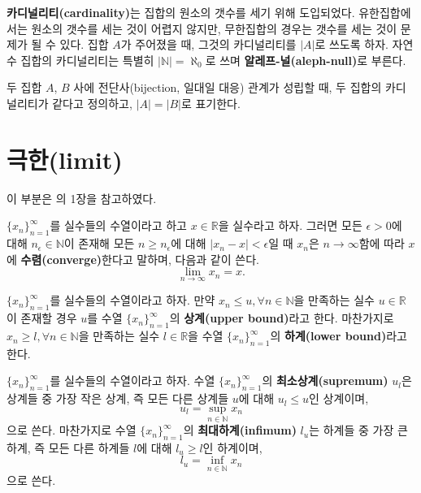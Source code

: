 \documentclass[b5paper,]{scrbook}
\theoremstyle{plain}
\theoremstyle{definition}
\numberwithin{equation}{section}
\let\BeginKnitrBlock\begin \let\EndKnitrBlock\end
\begin{document}
\textbf{카디널리티(cardinality)}는 집합의 원소의 갯수를 세기 위해 도입되었다. 유한집합에서는 원소의 갯수를 세는 것이 어렵지 않지만, 무한집합의 경우는 갯수를 세는 것이 문제가 될 수 있다. 집합 \(A\)가 주어졌을 때, 그것의 카디널리티를 \(|A|\)로 쓰도록 하자. 자연수 집합의 카디널리티는 특별히 \(|\mathbb{N}|=\aleph_{0}\)로 쓰며 \textbf{알레프-널(aleph-null)}로 부른다.

\BeginKnitrBlock{definition}[카디널리티가 같다]
\protect\hypertarget{def:unnamed-chunk-1}{}{\label{def:unnamed-chunk-1} {} }두 집합 \(A\), \(B\) 사에 전단사(bijection, 일대일 대응) 관계가 성립할 때, 두 집합의 카디널리티가 같다고 정의하고, \(|A|=|B|\)로 표기한다.
\EndKnitrBlock{definition}

\hypertarget{limit}{%
\section{극한(limit)}\label{limit}}

이 부분은 \citep{Polansky2011}의 1장을 참고하였다.

\BeginKnitrBlock{definition}[수열의 수렴]
\protect\hypertarget{def:unnamed-chunk-2}{}{\label{def:unnamed-chunk-2} {} }\(\{ x_{n}\}_{n=1}^{\infty}\)를 실수들의 수열이라고 하고 \(x\in\mathbb{R}\)을 실수라고 하자. 그러면 모든 \(\epsilon >0\)에 대해 \(n_{\epsilon}\in\mathbb{N}\)이 존재해 모든 \(n\geq n_{\epsilon}\)에 대해 \(|x_{n}-x|<\epsilon\)일 때 \(x_{n}\)은 \(n\rightarrow\infty\)함에 따라 \(x\)에 \textbf{수렴(converge)}한다고 말하며, 다음과 같이 쓴다.
\[\lim_{n\rightarrow\infty}x_{n}=x.\]
\EndKnitrBlock{definition}

\BeginKnitrBlock{definition}[상계와 하계]
\protect\hypertarget{def:unnamed-chunk-3}{}{\label{def:unnamed-chunk-3} {} }\(\{ x_{n}\}_{n=1}^{\infty}\)를 실수들의 수열이라고 하자. 만약 \(x_{n}\leq u , \forall n\in\mathbb{N}\)을 만족하는 실수 \(u\in\mathbb{R}\)이 존재할 경우 \(u\)를 수열 \(\{ x_{n}\}_{n=1}^{\infty}\)의 \textbf{상계(upper bound)}라고 한다. 마찬가지로 \(x_{n}\geq l, \forall n\in\mathbb{N}\)을 만족하는 실수 \(l\in\mathbb{R}\)을 수열 \(\{ x_{n}\}_{n=1}^{\infty}\)의 \textbf{하계(lower bound)}라고 한다.
\EndKnitrBlock{definition}

\BeginKnitrBlock{definition}[최소상계와 최대하계]
\protect\hypertarget{def:unnamed-chunk-4}{}{\label{def:unnamed-chunk-4} {} }\(\{ x_{n}\}_{n=1}^{\infty}\)를 실수들의 수열이라고 하자. 수열 \(\{ x_{n}\}_{n=1}^{\infty}\)의 \textbf{최소상계(supremum)} \(u_{l}\)은 상계들 중 가장 작은 상계, 즉 모든 다른 상계들 \(u\)에 대해 \(u_{l} \leq u\)인 상계이며,
\[u_{l}=\sup_{n\in\mathbb{N}}x_{n}\]
으로 쓴다. 마찬가지로 수열 \(\{ x_{n}\}_{n=1}^{\infty}\)의 \textbf{최대하계(infimum)} \(l_{u}\)는 하계들 중 가장 큰 하계, 즉 모든 다른 하계들 \(l\)에 대해 \(l_{u}\geq l\)인 하계이며,
\[l_{u}=\inf_{n\in\mathbb{N}}x_{n}\]
으로 쓴다.
\EndKnitrBlock{definition}
\end{document}

